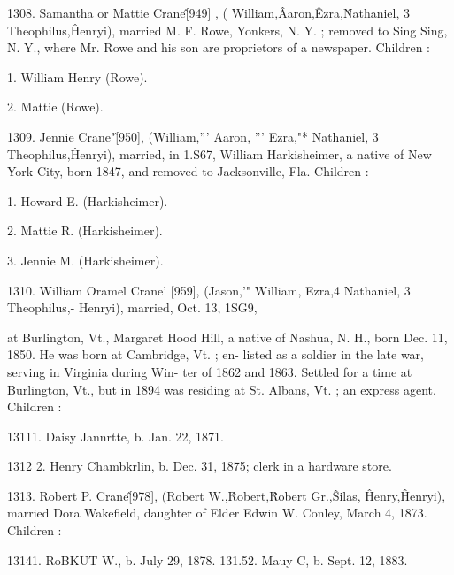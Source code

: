 \documentclass{book}
\begin{document}
1308. Samantha or Mattie Crane\^ [949] , ( William,\^ Aaron,\^ 
Ezra,\^ Nathaniel, 3 Theophilus,\^ Henryi), married M. F. Rowe, 
Yonkers, N. Y. ; removed to Sing Sing, N. Y., where Mr. Rowe 
and his son are proprietors of a newspaper. Children : 

1. William Henry (Rowe). 

2. Mattie (Rowe). 

1309. Jennie Crane"\^ [950], (William,''' Aaron, ''' Ezra,"* 
Nathaniel, 3 Theophilus,\^ Henryi), married, in 1.S67, William 
Harkisheimer, a native of New York City, born 1847, and 
removed to Jacksonville, Fla. Children : 

1. Howard E. (Harkisheimer). 

2. Mattie R. (Harkisheimer). 

3. Jennie M. (Harkisheimer). 

1310. William Oramel Crane' [959], (Jason,'" William,  
Ezra,4 Nathaniel, 3 Theophilus,- Henryi), married, Oct. 13, 1SG9, 




at Burlington, Vt., Margaret Hood Hill, a native of Nashua, N. 
H., born Dec. 11, 1850. He was born at Cambridge, Vt. ; en- 
listed as a soldier in the late war, serving in Virginia during Win- 
ter of 1862 and 1863. Settled for a time at Burlington, Vt., but 
in 1894 was residing at St. Albans, Vt. ; an express agent. 
Children : 

13111. Daisy Jannrtte, b. Jan. 22, 1871. 

1312  2. Henry Chambkrlin, b. Dec. 31, 1875; clerk in a hardware 
store. 

1313. Robert P. Crane\^ [978], (Robert W.,\^ Robert,\^ 
Robert Gr.,\^ Silas, \^ Henry,\^ Henryi), married Dora Wakefield, 
daughter of Elder Edwin W. Conley, March 4, 1873. Children : 

13141. RoBKUT W., b. July 29, 1878. 
131.52. Mauy C, b. Sept. 12, 1883. 
\end{document}
